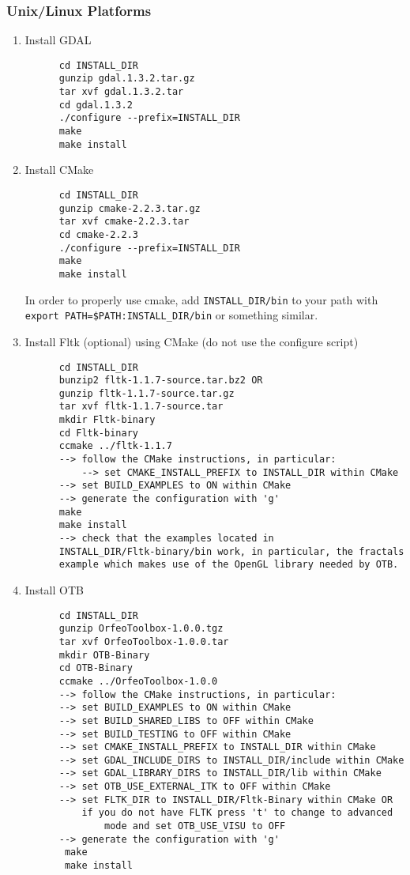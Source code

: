 \subsubsection{Unix/Linux Platforms}
\begin{enumerate}
    
\item Install GDAL
  \begin{verbatim}
      cd INSTALL_DIR
      gunzip gdal.1.3.2.tar.gz
      tar xvf gdal.1.3.2.tar
      cd gdal.1.3.2
      ./configure --prefix=INSTALL_DIR
      make
      make install
  \end{verbatim}
      

\item Install CMake
  \begin{verbatim}
      cd INSTALL_DIR
      gunzip cmake-2.2.3.tar.gz
      tar xvf cmake-2.2.3.tar
      cd cmake-2.2.3
      ./configure --prefix=INSTALL_DIR
      make
      make install
  \end{verbatim}
      In order to properly use cmake, add \texttt{INSTALL\_DIR/bin} to
      your path with \texttt{export PATH=\$PATH:INSTALL\_DIR/bin} or
      something similar.

\item Install Fltk (optional) using CMake (do not use the configure script)
  \begin{verbatim}
      cd INSTALL_DIR
      bunzip2 fltk-1.1.7-source.tar.bz2 OR
      gunzip fltk-1.1.7-source.tar.gz
      tar xvf fltk-1.1.7-source.tar
      mkdir Fltk-binary
      cd Fltk-binary
      ccmake ../fltk-1.1.7
      --> follow the CMake instructions, in particular:
          --> set CMAKE_INSTALL_PREFIX to INSTALL_DIR within CMake
	  --> set BUILD_EXAMPLES to ON within CMake
	  --> generate the configuration with 'g'
      make
      make install
      --> check that the examples located in
      INSTALL_DIR/Fltk-binary/bin work, in particular, the fractals
      example which makes use of the OpenGL library needed by OTB.
  \end{verbatim}
      

\item Install OTB
  \begin{verbatim}
      cd INSTALL_DIR
      gunzip OrfeoToolbox-1.0.0.tgz
      tar xvf OrfeoToolbox-1.0.0.tar
      mkdir OTB-Binary
      cd OTB-Binary
      ccmake ../OrfeoToolbox-1.0.0
      --> follow the CMake instructions, in particular:
	  --> set BUILD_EXAMPLES to ON within CMake
	  --> set BUILD_SHARED_LIBS to OFF within CMake
	  --> set BUILD_TESTING to OFF within CMake
	  --> set CMAKE_INSTALL_PREFIX to INSTALL_DIR within CMake
	  --> set GDAL_INCLUDE_DIRS to INSTALL_DIR/include within CMake
	  --> set GDAL_LIBRARY_DIRS to INSTALL_DIR/lib within CMake
	  --> set OTB_USE_EXTERNAL_ITK to OFF within CMake
	  --> set FLTK_DIR to INSTALL_DIR/Fltk-Binary within CMake OR
	      if you do not have FLTK press 't' to change to advanced
              mode and set OTB_USE_VISU to OFF 
	  --> generate the configuration with 'g'
       make
       make install
  \end{verbatim}
      
  
\end{enumerate}

